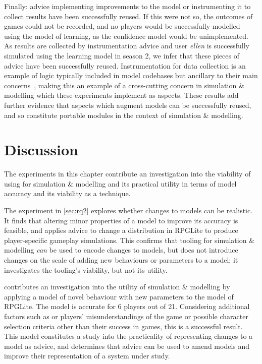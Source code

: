 Finally: advice implementing improvements to the model or instrumenting it to
collect results have been successfully reused. If this were not so, the outcomes
of games could not be recorded, and no players would be successfully modelled
using the model of learning, as the confidence model would be unimplemented. As
results are collected by instrumentation advice and user \emph{ellen} is
successfully simulated using the learning model in season 2, we infer that these
pieces of advice have been successfully reused. Instrumentation for data
collection is an example of logic typically included in model codebases but
ancillary to their main concerns~\cite{gulyas1999use}, making this an example of
a cross-cutting concern in simulation \& modelling which these experiments
implement as aspects. These results add further evidence that aspects which
augment models can be successfully reused, and so constitute portable modules in
the context of simulation \& modelling.



\section{Discussion}
\label{experiment_results_final_discussion}

The experiments in this chapter contribute an investigation into the
viability of using \aop for simulation \& modelling and its practical utility
in terms of model accuracy and its viability as a technique.

The experiment in \cref{sec:rq2} explores whether \aspectoriented{} changes to
models can be realistic. It finds that altering minor properties of a model to
improve its accuracy is feasible, and applies advice to change a distribution in
RPGLite to produce player-specific gameplay simulations. This confirms that
\aspectoriented{} tooling for simulation \& modelling \emph{can} be used to
encode changes to models, but does not introduce changes on the scale of adding
new behaviours or parameters to a model; it investigates the tooling's
viability, but not its utility.

 contributes an investigation into the utility of
\aspectoriented{} simulation \& modelling by applying a model of novel behaviour
with new parameters to the model of RPGLite. The model is accurate for 6 players
out of 21. Considering additional factors such as or players' misunderstandings
of the game or possible character selection criteria other than their success in
games, this is a successful result. This model constitutes a study into the
practicality of representing changes to a model as advice, and determines that
advice can be used to amend models and improve their representation of a system
under study.

